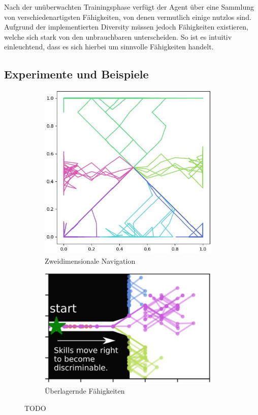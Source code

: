 \smallspace

Nach der unüberwachten Trainingsphase verfügt der Agent über eine Sammlung von verschiedenartigsten Fähigkeiten, von denen vermutlich einige nutzlos sind. Aufgrund der implementierten Diversity müssen jedoch Fähigkeiten existieren, welche sich stark von den unbrauchbaren unterscheiden. So ist es intuitiv einleuchtend, dass es sich hierbei um sinnvolle Fähigkeiten handelt.

\subsection{Experimente und Beispiele}
\label{sec:examplesdiversity}
\begin{figure}[h]
\begin{subfigure}{0.41\textwidth}
\includegraphics[width=0.95\textwidth]{images/example_diayn_1.JPG}
\caption{Zweidimensionale Navigation} \label{img:diayn_ex1}
\end{subfigure}
\begin{subfigure}{0.59\textwidth}
\includegraphics[width=0.95\textwidth, right]{images/example_diayn_2.JPG}
\caption{Überlagernde Fähigkeiten} \label{img:diayn_ex2}
\end{subfigure}
\caption{TODO} \label{img:diayn_ex}
\end{figure}


